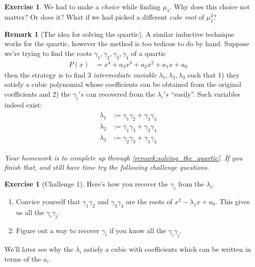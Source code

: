 \documentclass[reqno, 12pt, letter]{article}
\theoremstyle{plain}
\theoremstyle{definition}
\newtheorem{remark}[theorem]{Remark}
\newtheorem{exercise}[theorem]{Exercise}
\theoremstyle{remark}
\numberwithin{equation}{section}
\begin{document}
	\begin{exercise}
		We had to make a \emph{choice} while finding $ \mu_1$. Why does this choice not matter? Or does it? What if we had picked a different \emph{cube root} of $ \mu_1^3$?
	\end{exercise}
	
	\begin{remark}[The idea for solving the quartic]
		\label{remark:solving_the_quartic}
		A similar inductive technique works for the quartic, however the method is too tedious to do by hand. Suppose we're trying to find the roots $ \gamma_1, \gamma_2, \gamma_3, \gamma_4$ of a quartic \begin{align*}
			P(x) &= x^4 + a_3x^3 + a_2x^2 + a_1x + a_0
		\end{align*}
		then the strategy is to find 3 \emph{intermediate variable} $ \lambda_1, \lambda_2, \lambda_3$ such that 1) they satisfy a cubic polynomial whose coefficients can be obtained from the original coefficients and 2) the $\gamma_i's$ can recovered from the $ \lambda_i's$ ``easily''. Such variables indeed exist:
			\begin{align}
				\label{equation:intermediate_variables_quartic}
				\begin{split}
					\lambda_1 &:= \gamma_1 \gamma_2 + \gamma_3 \gamma_4 \\
					\lambda_2 &:= \gamma_1 \gamma_3 + \gamma_2 \gamma_4 \\
					\lambda_3 &:= \gamma_2 \gamma_3 + \gamma_1 \gamma_4 
				\end{split}
			\end{align}
			
		{\it Your homework is to complete up through \autoref{remark:solving_the_quartic}. If you finish that, and still have time try the following challenge questions.}
			
		\begin{exercise}[Challenge 1]
			Here's how you recover the $ \gamma_i$ from the $ \lambda_i$.
			\begin{enumerate}
				\item Convice yourself that $ \gamma_1 \gamma_2$ and $\gamma_3 \gamma_4$ are the roots of $ x^2 - \lambda_1 x + a_0$. This gives us all the $ \gamma_i \gamma_j$.
				\item Figure out a way to recover $ \gamma_i$ if you know all the $ \gamma_i \gamma_j$.
			\end{enumerate}
		\end{exercise}
		We'll later see why the $ \lambda_i$ satisfy a cubic with coefficients which can be written in terms of the $ a_i$.
	\end{remark}
	
\end{document}
